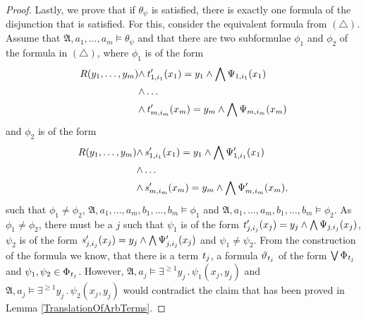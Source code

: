 \begin{proof}
	Lastly, we prove that if $\theta_\psi$ is satisfied, there is exactly one formula of the disjunction that is satisfied.
	For this, consider the equivalent formula from $(\triangle)$.
	Assume that $\mathfrak A,a_1,\dots,a_m\models \theta_\psi$ and that there are two subformulae $\phi_1$ and $\phi_2$ of the formula in $(\triangle)$, where $\phi_1$ is of the form 
	\begin{align*}
		R(y_1,\dots,y_m)\land & \operatorname{\mathit{t}}_{1,i_1}'(x_1)=y_1 \land \bigwedge\Psi_{1,i_1}(x_1) \\
		\land & \dots \\
		\land & \operatorname{\mathit{t}}_{m,i_m}'(x_m)=y_m \land \bigwedge\Psi_{m,i_m}(x_m)
	\end{align*}
	and $\phi_2$ is of the form
	\begin{align*}
		R(y_1,\dots,y_m)\land & \operatorname{\mathit{s}}_{1,i_1}'(x_1)=y_1 \land \bigwedge\Psi'_{1,i_1}(x_1) \\
		\land & \dots \\
		\land & \operatorname{\mathit{s}}_{m,i_m}'(x_m)=y_m \land \bigwedge\Psi'_{m,i_m}(x_m),
	\end{align*}
	such that $\phi_1\neq\phi_2$, $\mathfrak A,a_1,\dots,a_m,b_1,\dots,b_m\models \phi_1$ and $\mathfrak A,a_1,\dots,a_m,b_1,\dots,b_m\models \phi_2$.
	As $\phi_1\neq \phi_2$, there must be a $j$ such that $\psi_1$ is of the form $\operatorname{\mathit{t}}'_{j,i_j}(x_j)=y_j\land \bigwedge \Psi_{j,i_j}(x_j)$, $\psi_2$ is of the form $\operatorname{\mathit{s}}'_{j,i_j}(x_j)=y_j\land\bigwedge \Psi'_{j,i_j}(x_j)$ and $\psi_1\neq\psi_2$.
	From the construction of the formula we know, that there is a term $\operatorname{\mathit{t}}_j$, a formula $\vartheta_{\operatorname{\mathit{t}}_j}$ of the form $\bigvee \Phi_{\operatorname{\mathit{t}}_j}$ and $\psi_1,\psi_2\in\Phi_{\operatorname{\mathit{t}}_j}$.
	However, $\mathfrak A,a_j\models \exists^{\geq 1}y_j \operatorname{.} \psi_1(x_j,y_j)$ and $\mathfrak A,a_j\models \exists^{\geq 1}y_j\operatorname{.}\psi_2(x_j,y_j)$ would contradict the claim that has been proved in Lemma \ref{TranslationOfArbTerms}.
\end{proof}

